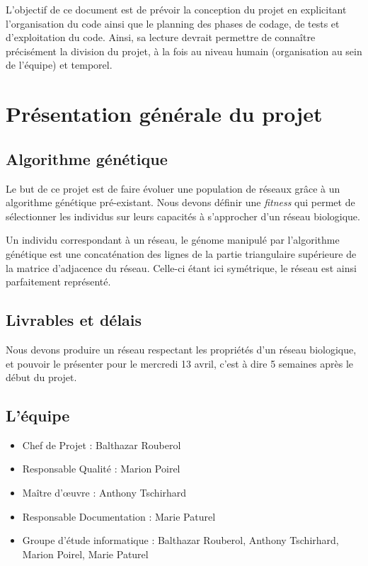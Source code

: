 


\maketitle

L'objectif de ce document est de prévoir la conception du projet en explicitant l'organisation du code ainsi que le planning des phases de codage, de tests et d'exploitation du code. Ainsi, sa lecture devrait permettre de connaître précisément la division du projet, à la fois au niveau humain (organisation au sein de l'équipe) et temporel.

\section{Présentation générale du projet}

\subsection{Algorithme génétique}
Le but de ce projet est de faire évoluer une population de réseaux grâce à un algorithme génétique pré-existant. Nous devons définir une \textit{fitness} qui permet de sélectionner les individus sur leurs capacités à s'approcher d'un réseau biologique.

Un individu correspondant à un réseau, le génome manipulé par l'algorithme génétique est une concaténation des lignes de la partie triangulaire supérieure de la matrice d'adjacence du réseau. Celle-ci étant ici symétrique, le réseau est ainsi parfaitement représenté.

\subsection{Livrables et délais}
Nous devons produire un réseau respectant les propriétés d'un réseau biologique, et pouvoir le présenter pour le mercredi 13 avril, c'est à dire 5 semaines après le début du projet.

\subsection{L'équipe}
\begin{itemize}
\item Chef de Projet : Balthazar Rouberol
\item Responsable Qualité : Marion Poirel
\item Ma\^itre d'œuvre : Anthony Tschirhard
\item Responsable Documentation : Marie Paturel
\item Groupe d'étude informatique : Balthazar Rouberol, Anthony Tschirhard, Marion Poirel, Marie Paturel
\end{itemize}



